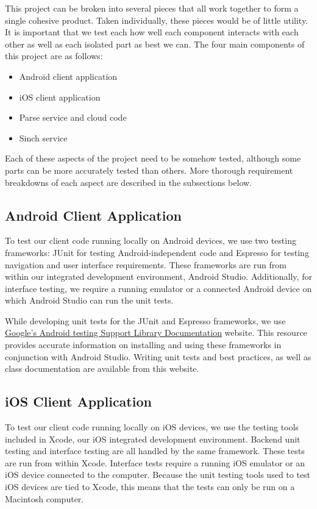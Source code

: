 This project can be broken into several pieces that all work together to form a
single cohesive product. Taken individually, these pieces would be of little
utility. It is important that we test each how well each component interacts
with each other as well as each isolated part as best we can. The four main
components of this project are as follows:

\begin{itemize}
	\item Android client application
	\item iOS client application
	\item Parse service and cloud code
	\item Sinch service
\end{itemize}

Each of these aspects of the project need to be somehow tested, although some
parts can be more accurately tested than others. More thorough requirement
breakdowns of each aspect are described in the subsections below.


\subsection{Android Client Application}

To test our client code running locally on Android devices, we use two testing
frameworks: JUnit for testing Android-independent code and Espresso for testing
navigation and user interface requirements. These frameworks are run from within
our integrated development environment, Android Studio. Additionally, for
interface testing, we require a running emulator or a connected Android device on
which Android Studio can run the unit tests.

While developing unit tests for the JUnit and Espresso frameworks, we use
\href{https://google.github.io/android-testing-support-library/docs/index.html}
{Google's Android testing Support Library Documentation} website. This resource
provides accurate information on installing and using these frameworks in
conjunction with Android Studio. Writing unit tests and best practices, as well
as class documentation are available from this website.


\subsection{iOS Client Application}

To test our client code running locally on iOS devices, we use the testing tools
included in Xcode, our iOS integrated development environment. Backend unit
testing and interface testing are all handled by the same framework. These tests
are run from within Xcode. Interface tests require a running iOS emulator or an
iOS device connected to the computer. Because the unit testing tools used to
test iOS devices are tied to Xcode, this means that the tests can only be run on
a Macintosh computer.

